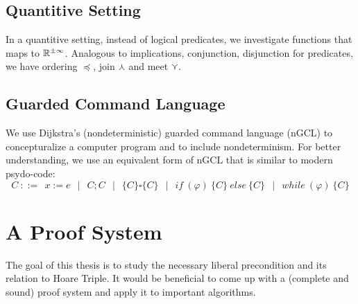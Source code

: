 \documentclass[adraft,hidelinks]{eptcs}
\begin{document}
\subsection{Quantitive Setting}
In a quantitive setting, instead of logical predicates, we investigate functions that maps to $\mathbb{R}^{\pm\infty}$. 
Analogous to implications, conjunction, disjunction for predicates, we have ordering $\preceq$, join $\curlywedge$ and meet $\curlyvee$. 

\subsection{Guarded Command Language}
We use Dijkstra's (nondeterministic) guarded command language\cite{Dijkstra1975} (nGCL) to concepturalize a computer program and to include nondeterminism. 
For better understanding, we use an equivalent form\cite{Zhang2022} of nGCL that is similar to modern psydo-code: 
$$C\ ::=\ \  x:= e \ \ \mid\ \  C;C \ \ \mid\ \  \{C\} \square \{C\} \ \ \mid\ \  
if\ (\varphi)\ \{C\}\ else\ \{C\} \ \ \mid\ \  while\ (\varphi)\ \{C\}$$

\section{A Proof System}
The goal of this thesis is to study the necessary liberal precondition and its relation to Hoare Triple. 
It would be beneficial to come up with a (complete and sound) proof system and apply it to important algorithms. 








\end{document}
